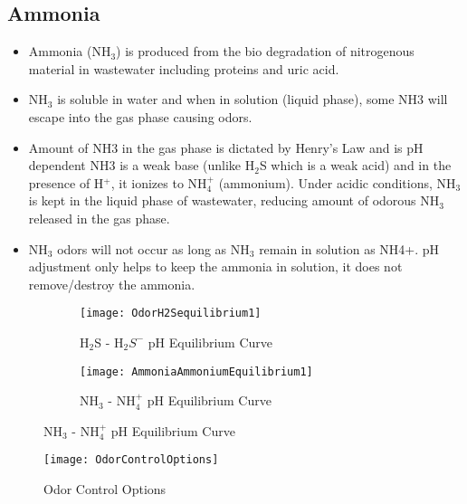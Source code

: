 \subsection{Ammonia}
\begin{itemize}
\item Ammonia (NH$_3$) is produced from the bio degradation of nitrogenous material in wastewater including proteins and uric acid.
\item NH$_3$ is soluble in water and when in solution (liquid phase), some NH3 will escape into the gas phase causing odors.
\item Amount of NH3 in the gas phase is dictated by Henry’s Law and is pH dependent
NH3 is a weak base (unlike H$_2$S which is a weak acid) and in the presence of H$^+$, it ionizes to NH$_4^+$ (ammonium).
Under acidic conditions, NH$_3$ is kept in the liquid phase of wastewater, reducing amount of odorous NH$_3$  released in the gas phase.
\item NH$_3$ odors will not occur as long as NH$_3$ remain in solution as NH4+.
pH adjustment only helps to keep the ammonia in solution, it does not remove/destroy the ammonia.
\end{itemize}

\begin{figure}[h!]
  \centering
  \begin{subfigure}[b]{\linewidth}
    \texttt{[image: OdorH2Sequilibrium1]}
    \caption{H$_2$S - H$_2S^-$ pH Equilibrium Curve}
  \end{subfigure}
  \hspace{1cm}
  \begin{subfigure}[b]{\linewidth}
    \texttt{[image: AmmoniaAmmoniumEquilibrium1]}
    \caption{NH$_3$ - NH$_4^+$ pH Equilibrium Curve}
  \end{subfigure}
\end{figure}
	
%	

\begin{sidewaysfigure}[!htp]
	\begin{center}
		\texttt{[image: OdorControlOptions]}
			\caption{Odor Control Options}
	\end{center}
\end{sidewaysfigure}

